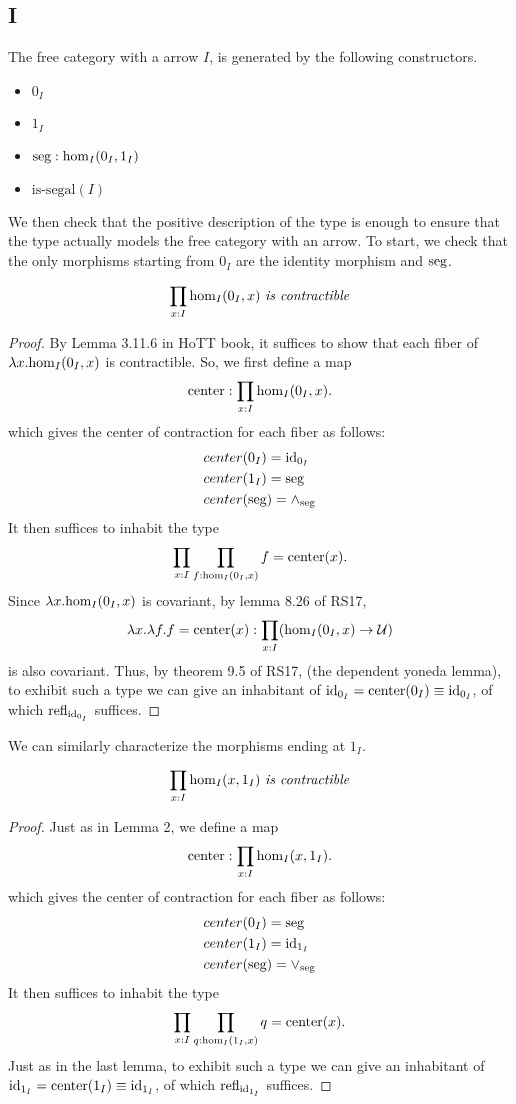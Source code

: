 \documentclass[main.tex]{subfiles}
\begin{document}
\subsection{I}
The free category with a arrow $I$, is generated by the following constructors.
\begin{itemize}
    \item $0_I$
    \item $1_I$
    \item $\seg : \ho[I]{0_I}{1_I}$
    \item $\text{is-segal}(I)$
\end{itemize}
We then check that the positive description of the type is enough to ensure that the type actually models the free category with an arrow. To start, we check that the only morphisms starting from $0_I$ are the identity morphism and $\seg$.
\begin{lemma}
\[
\prod_{x:I}\ho[I]{0_I}{x}\text{ \emph{is contractible}}
\]
\end{lemma}
\begin{proof}
    By Lemma 3.11.6 in HoTT book, it suffices to show that each fiber of $\lambda x. \ho[I]{0_I}{x}$ is contractible. So, we first define a map $$\text{center} : \displaystyle \prod_{x:I}\ho[I]{0_I}{x}.$$
    which gives the center of contraction for each fiber as follows:
    \begin{align*}
        &center(0_I) = \id{0_I}\\
        &center(1_I) = \seg\\
        &center(\seg) = \land_\seg
    \end{align*}
    It then suffices to inhabit the type
    $$\prod_{x:I}\prod_{f:\ho[I]{0_I}{x}}f=\text{center}(x).$$
    Since $\lambda x.\ho[I]{0_I}{x}$ is covariant, by lemma 8.26 of RS17, $$\lambda x. \lambda f.f = \text{center}(x):\displaystyle \prod_{x:I}(\ho[I]{0_I}{x} \to \mathcal{U})$$
    is also covariant. Thus, by theorem 9.5 of RS17, (the dependent yoneda lemma), to exhibit such a type we can give an inhabitant of $\id{0_I}=\text{center}(0_I) \equiv \id{0_I}$, of which $\refl{\id{0_I}}$ suffices.
\end{proof}
We can similarly characterize the morphisms ending at $1_I$. 
\begin{lemma}
\[
\prod_{x:I}\ho[I]{x}{1_I}\text{ \emph{is contractible}}
\]
\end{lemma}
\begin{proof}
    Just as in Lemma 2, we define a map $$\text{center} : \displaystyle \prod_{x:I}\ho[I]{x}{1_I}.$$
    which gives the center of contraction for each fiber as follows:
    \begin{align*}
        &center(0_I) = \seg\\
        &center(1_I) = \id{1_I}\\
        &center(\seg) = \lor_\seg
    \end{align*}
    It then suffices to inhabit the type
    $$\prod_{x:I}\prod_{q:\ho[I]{1_I}{x}}q=\text{center}(x).$$
    Just as in the last lemma, to exhibit such a type we can give an inhabitant of $\id{1_I}=\text{center}(1_I) \equiv \id{1_I}$, of which $\refl{\id{1_I}}$ suffices.
\end{proof}
\end{document}
